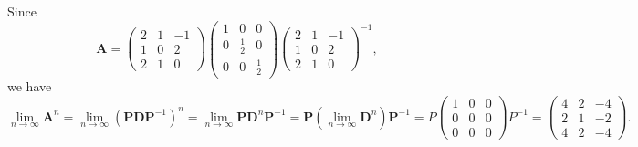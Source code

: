\documentclass{article}
\newcommand{\matr}[1]{\mathbf{#1}}
\begin{document}
\begin{enumerate}[(a)]
    Since $$\matr{A}=\begin{pmatrix}2&1&-1\\1&0&2\\2&1&0\end{pmatrix}\begin{pmatrix}1&0&0\\0&\frac{1}{2}&0\\0&0&\frac{1}{2}\end{pmatrix}\begin{pmatrix}2&1&-1\\1&0&2\\2&1&0\end{pmatrix}^{-1},$$ we have
    $$\lim_{n\to\infty}\matr{A}^n=\lim_{n\to\infty}(\matr{PDP}^{-1})^n=\lim_{n\to\infty}\matr{P}\matr{D}^n\matr{P}^{-1}=\matr{P}\left(\lim_{n\to\infty}\matr{D}^n\right)\matr{P}^{-1}=P\begin{pmatrix}1&0&0\\0&0&0\\0&0&0\end{pmatrix}P^{-1}=\begin{pmatrix}4&2&-4\\2&1&-2\\4&2&-4\end{pmatrix}.$$
\end{enumerate}
\end{document}
